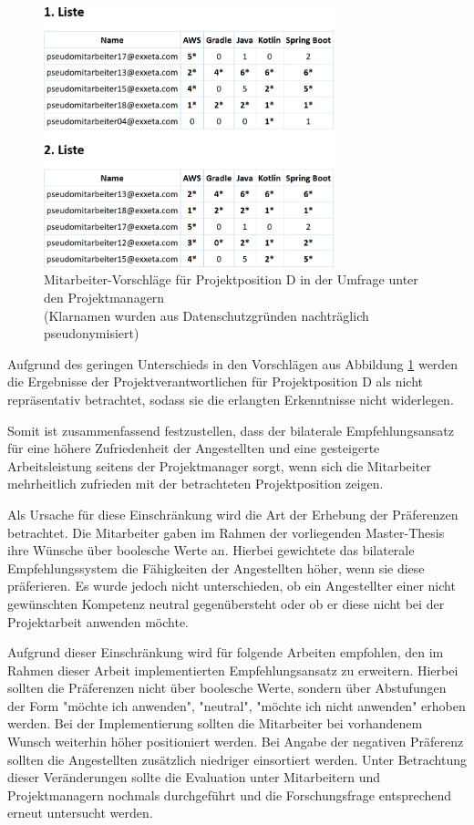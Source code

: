 \begin{figure}[h]
	\centering
	\includegraphics[width=0.75\textwidth]{gfx/projektposition-d.png}
	\caption{Mitarbeiter-Vorschläge für Projektposition D in der Umfrage unter den Projektmanagern\\
	(Klarnamen wurden aus Datenschutzgründen nachträglich pseudonymisiert)}
	\label{fig:diskussion:interpretation:abb2}
\end{figure}

Aufgrund des geringen Unterschieds in den Vorschlägen aus Abbildung \ref{fig:diskussion:interpretation:abb2} werden die Ergebnisse der Projektverantwortlichen für Projektposition D als nicht repräsentativ betrachtet, sodass sie die erlangten Erkenntnisse nicht widerlegen.

Somit ist zusammenfassend festzustellen, dass der bilaterale Empfehlungsansatz für eine höhere Zufriedenheit der Angestellten und eine gesteigerte Arbeitsleistung seitens der Projektmanager sorgt, wenn sich die Mitarbeiter mehrheitlich zufrieden mit der betrachteten Projektposition zeigen.

Als Ursache für diese Einschränkung wird die Art der Erhebung der Präferenzen betrachtet. Die Mitarbeiter gaben im Rahmen der vorliegenden Master-Thesis ihre Wünsche über boolesche Werte an. Hierbei gewichtete das bilaterale Empfehlungssystem die Fähigkeiten der Angestellten höher, wenn sie diese präferieren. Es wurde jedoch nicht unterschieden, ob ein Angestellter einer nicht gewünschten Kompetenz neutral gegenübersteht oder ob er diese nicht bei der Projektarbeit anwenden möchte.

Aufgrund dieser Einschränkung wird für folgende Arbeiten empfohlen, den im Rahmen dieser Arbeit implementierten Empfehlungsansatz zu erweitern. Hierbei sollten die Präferenzen nicht über boolesche Werte, sondern über Abstufungen der Form "möchte ich anwenden", "neutral", "möchte ich nicht anwenden" erhoben werden. Bei der Implementierung sollten die Mitarbeiter bei vorhandenem Wunsch weiterhin höher positioniert werden. Bei Angabe der negativen Präferenz sollten die Angestellten zusätzlich niedriger einsortiert werden. Unter Betrachtung dieser Veränderungen sollte die Evaluation unter Mitarbeitern und Projektmanagern nochmals durchgeführt und die Forschungsfrage entsprechend erneut untersucht werden.

